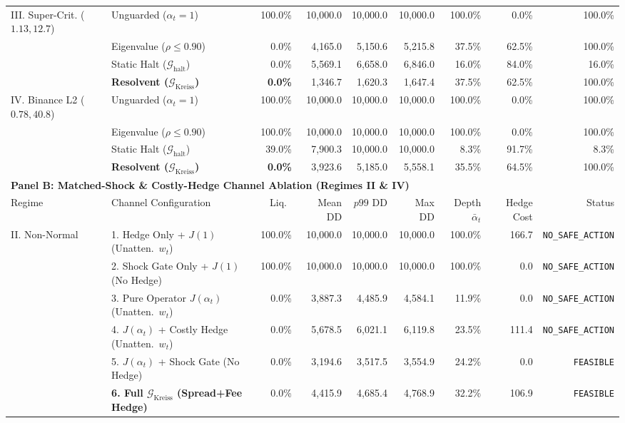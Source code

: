 \begin{table}[htbp]
{\begin{tabular}{llrrrrrrr}
\midrule
III. Super-Crit. ($1.13, 12.7$) & Unguarded ($\alpha_t=1$) & 100.0\% & 10,000.0 & 10,000.0 & 10,000.0 & 100.0\% & 0.0\% & 100.0\% \\
 & Eigenvalue ($\rho \le 0.90$) & 0.0\% & 4,165.0 & 5,150.6 & 5,215.8 & 37.5\% & 62.5\% & 100.0\% \\
 & Static Halt ($\mathcal{G}_{\mathrm{halt}}$) & 0.0\% & 5,569.1 & 6,658.0 & 6,846.0 & 16.0\% & 84.0\% & 16.0\% \\
 & \textbf{Resolvent ($\mathcal{G}_{\mathrm{Kreiss}}$)} & \textbf{0.0\%} & 1,346.7 & 1,620.3 & 1,647.4 & 37.5\% & 62.5\% & 100.0\% \\
\midrule
IV. Binance L2 ($0.78, 40.8$) & Unguarded ($\alpha_t=1$) & 100.0\% & 10,000.0 & 10,000.0 & 10,000.0 & 100.0\% & 0.0\% & 100.0\% \\
 & Eigenvalue ($\rho \le 0.90$) & 100.0\% & 10,000.0 & 10,000.0 & 10,000.0 & 100.0\% & 0.0\% & 100.0\% \\
 & Static Halt ($\mathcal{G}_{\mathrm{halt}}$) & 39.0\% & 7,900.3 & 10,000.0 & 10,000.0 & 8.3\% & 91.7\% & 8.3\% \\
 & \textbf{Resolvent ($\mathcal{G}_{\mathrm{Kreiss}}$)} & \textbf{0.0\%} & 3,923.6 & 5,185.0 & 5,558.1 & 35.5\% & 64.5\% & 100.0\% \\
\midrule
\multicolumn{9}{l}{\textbf{Panel B: Matched-Shock \& Costly-Hedge Channel Ablation (Regimes II \& IV)}} \\
\midrule
Regime & Channel Configuration & Liq.\ & Mean DD & $p99$ DD & Max DD & Depth $\bar{\alpha}_t$ & Hedge Cost & Status \\
\midrule
II. Non-Normal & 1. Hedge Only + $J(1)$ (Unatten.\ $w_t$) & 100.0\% & 10,000.0 & 10,000.0 & 10,000.0 & 100.0\% & 166.7 & \texttt{NO\_SAFE\_ACTION} \\
 & 2. Shock Gate Only + $J(1)$ (No Hedge) & 100.0\% & 10,000.0 & 10,000.0 & 10,000.0 & 100.0\% & 0.0 & \texttt{NO\_SAFE\_ACTION} \\
 & 3. Pure Operator $J(\alpha_t)$ (Unatten.\ $w_t$) & 0.0\% & 3,887.3 & 4,485.9 & 4,584.1 & 11.9\% & 0.0 & \texttt{NO\_SAFE\_ACTION} \\
 & 4. $J(\alpha_t)$ + Costly Hedge (Unatten.\ $w_t$) & 0.0\% & 5,678.5 & 6,021.1 & 6,119.8 & 23.5\% & 111.4 & \texttt{NO\_SAFE\_ACTION} \\
 & 5. $J(\alpha_t)$ + Shock Gate (No Hedge) & 0.0\% & 3,194.6 & 3,517.5 & 3,554.9 & 24.2\% & 0.0 & \texttt{FEASIBLE} \\
 & \textbf{6. Full $\mathcal{G}_{\mathrm{Kreiss}}$ (Spread+Fee Hedge)} & 0.0\% & 4,415.9 & 4,685.4 & 4,768.9 & 32.2\% & 106.9 & \texttt{FEASIBLE} \\

\end{tabular}}
\end{table}
